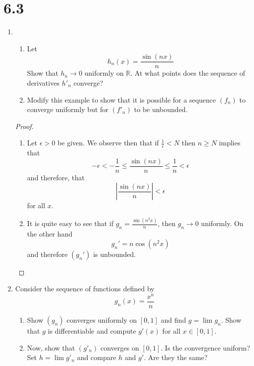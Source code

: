 \section*{6.3}
\begin{enumerate}
    \item 
    \begin{enumerate}
        \item Let
        \[
        h_n(x) = \frac{\sin(nx)}{n}
        \]
        Show that \( h_n \rightarrow 0 \) uniformly on \( \mathbb{R} \). At what points does the sequence of derivatives \( h'_n \) converge?
        
        \item Modify this example to show that it is possible for a sequence \( (f_n) \) to converge uniformly but for \( (f'_n) \) to be unbounded.
    \end{enumerate}
    
    \begin{proof}
    \begin{enumerate}
        \item Let \( \epsilon > 0 \) be given. We observe then that if \( \frac{1}{\epsilon} < N \) then \( n \geq N \) implies that
        \[
        -\epsilon < -\frac{1}{n} \leq \frac{\sin(nx)}{n} \leq \frac{1}{n} < \epsilon
        \]
        and therefore, that
        \[
        \left| \frac{\sin(nx)}{n} \right| < \epsilon 
        \]
        for all \( x \). 
        
        \item It is quite easy to see that if \( g_n = \frac{\sin(n^2x)}{n} \), then \( g_n \rightarrow 0 \) uniformly. On the other hand
        \[
        g_n' = n \cos(n^2x)
        \]
        and therefore \( (g_n') \) is unbounded. 
    \end{enumerate}
    \end{proof}
    
    \item Consider the sequence of functions defined by
    \[
    g_n(x) = \frac{x^n}{n}
    \]
    \begin{enumerate}
        \item Show \( (g_n) \) converges uniformly on \( [0,1] \) and find \( g = \lim g_n \). Show that \( g \) is differentiable and compute \( g'(x) \) for all \( x \in [0,1] \).
        
        \item Now, show that \( (g'_n) \) converges on \( [0,1] \). Is the convergence uniform? Set \( h = \lim g'_n \) and compare \( h \) and \( g' \). Are they the same? 
    \end{enumerate}
    

\end{enumerate}
